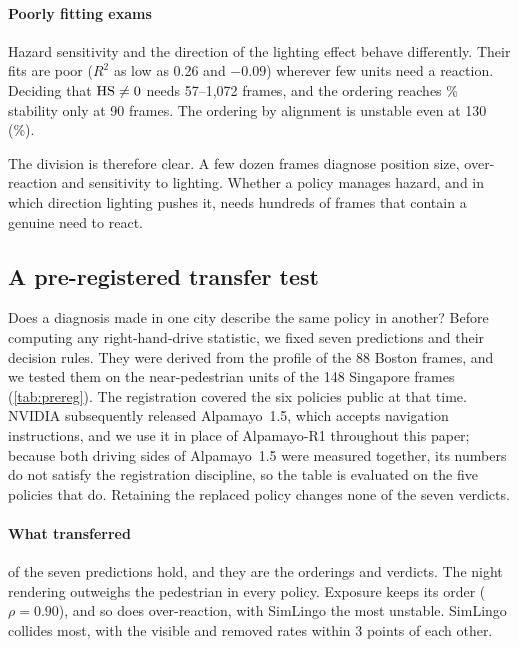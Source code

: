 \paragraph{Poorly fitting exams}
Hazard sensitivity and the direction of the lighting effect behave differently. Their fits are poor
($R^2$ as low as 0.26 and $-0.09$) wherever few units need a reaction. Deciding that $\mathrm{HS}\neq0$ needs
57--1{,}072 frames, and the ordering reaches \NumRankHSninety\% stability only at 90 frames. The
ordering by alignment is unstable even at 130 (\NumRankAlignOneThirty\%).

The division is therefore clear. A few dozen frames diagnose position size, over-reaction and
sensitivity to lighting. Whether a policy manages hazard, and in which direction lighting pushes it,
needs hundreds of frames that contain a genuine need to react.

\subsection{A pre-registered transfer test}
Does a diagnosis made in one city describe the same policy in another? Before computing any
right-hand-drive statistic, we fixed seven predictions and their decision rules. They were derived from the profile of the 88 Boston
frames, and we tested them on the near-pedestrian units of the 148 Singapore frames
(\cref{tab:prereg}). The registration covered the six policies public at that time. NVIDIA
subsequently released Alpamayo~1.5, which accepts navigation instructions, and we use it in place of
Alpamayo-R1 throughout this paper; because both driving sides of Alpamayo~1.5 were measured together,
its numbers do not satisfy the registration discipline, so the table is evaluated on the five policies
that do. Retaining the replaced policy changes none of the seven verdicts.



\paragraph{What transferred}
\NumPass{} of the seven predictions hold, and they are the orderings and verdicts. The night rendering
outweighs the pedestrian in every policy. Exposure keeps its order ($\rho=0.90$), and so does
over-reaction, with SimLingo the most unstable. SimLingo collides most, with the visible and removed
rates within 3 points of each other.

